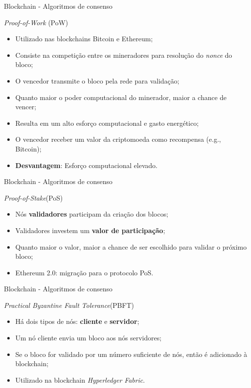 \begin{frame}{Blockchain - Algoritmos de consenso}
    \begin{exampleblock}{\textit{Proof-of-Work} (PoW)}
    \begin{itemize}
        \item Utilizado nas blockchains Bitcoin e Ethereum;
        \item Consiste na competição entre os mineradores para resolução do \textit{nonce} do bloco;
        \item O vencedor transmite o bloco pela rede para validação;
        \item Quanto maior o poder computacional do minerador, maior a chance de vencer;
        \item Resulta em um alto esforço computacional e gasto energético;
        \item O vencedor receber um valor da criptomoeda como recompensa (e.g., Bitcoin);
        \item \textbf{Desvantagem}: Esforço computacional elevado.
    \end{itemize}
    \end{exampleblock}
\end{frame}

\begin{frame}{Blockchain - Algoritmos de consenso}
    \begin{exampleblock}{\textit{Proof-of-Stake}(PoS)}
    \begin{itemize}
        \item Nós \textbf{validadores} participam da criação dos blocos;
        \item Validadores investem um \textbf{valor de participação};
        \item Quanto maior o valor, maior a chance de ser escolhido para validar o próximo bloco;
        \item Ethereum 2.0: migração para o protocolo PoS.
    \end{itemize}
    \end{exampleblock}
\end{frame}

\begin{frame}{Blockchain - Algoritmos de consenso}
    \begin{exampleblock}{\textit{Practical Byzantine Fault Tolerance}(PBFT)}
    \begin{itemize}
        \item Há dois tipos de nós: \textbf{cliente} e \textbf{servidor};
        \item Um nó cliente envia um bloco aos nós servidores;
        \item Se o bloco for validado por um número suficiente de nós, então é adicionado à blockchain;
        \item Utilizado na blockchain \textit{Hyperledger Fabric}.
    \end{itemize}
    \end{exampleblock}     
\end{frame}

